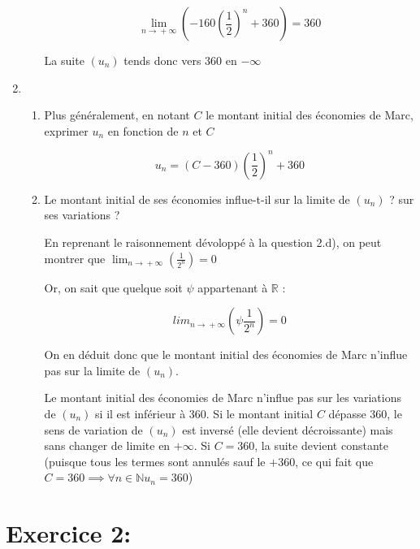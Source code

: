 \documentclass[10pt]{scrartcl}
\begin{document}
\begin{enumerate}[label=\textbf{\arabic*{}.}]
\begin{enumerate}[label=\textbf{\alph*)}]
        \[
            \lim_{n\rightarrow{} +\infty{}}\left(-160\left(\frac{1}{2}\right)^n+360\right) = 360
        \]

        La suite $(u_n)$ tends donc vers $360$ en $-\infty{}$
    \end{enumerate}

    \item \begin{enumerate}[label=\textbf{\alph*{})}]
        \item  Plus généralement, en notant $C$ le montant initial des économies de Marc, exprimer $u_n$ en fonction de $n$ et $C$

        \[
            u_n = (C - 360)\left(\frac{1}{2}\right)^n + 360
        \]

        \item Le montant initial de ses économies influe-t-il sur la limite de $(u_n)$ ? sur ses variations ?

        En reprenant le raisonnement dévoloppé à la question 2.d), on peut montrer que $\displaystyle{}\lim_{n\rightarrow{}+\infty{}}\left(\frac{1}{2^n}\right) = 0$

        Or, on sait que quelque soit $\psi$ appartenant à $\mathbb{R}$ :

        \[
            \displaystyle{}lim_{n\rightarrow{}+\infty{}}\left(\psi\frac{1}{2^n}\right) = 0
        \]

        On en déduit donc que le montant initial des économies de Marc n'influe pas sur la limite de $(u_n)$.

        Le montant initial des économies de Marc n'influe pas sur les variations de $(u_n)$ si il est inférieur à 360. Si le montant initial $C$ dépasse 360, le sens de variation de $(u_n)$ est inversé (elle devient décroissante) mais sans changer de limite en $+\infty{}$. Si $C = 360$, la suite devient constante (puisque tous les termes sont annulés sauf le $+360$, ce qui fait que $C=360 \implies{} \forall n \in \mathbb{N}u_n = 360$)

    \end{enumerate}
\end{enumerate}







\newpage{}%
\section*{Exercice 2:}%
\end{document}
